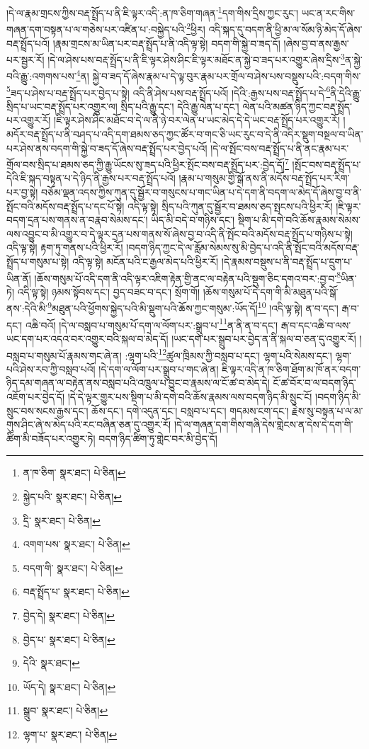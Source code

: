 །དེ་ལ་རྣམ་གྲངས་ཀྱིས་བརྡ་སྤྲོད་པ་ནི་ཇི་ལྟར་འདི་:ན་ཁ་ཅིག་གཞན་\footnote{ན་ཁ་ཅིག་  སྣར་ཐང་།  པེ་ཅིན། }དག་གིས་དྲིས་ཀྱང་རུང་། ཡང་ན་རང་གིས་གཞན་དག་བསྟན་པ་ལ་གཅེས་པར་འཛིན་པ་:བསྐྱེད་པའི་\footnote{སྐྱེད་པའི་  སྣར་ཐང་།  པེ་ཅིན། }ཕྱིར། འདི་སྐད་དུ་བདག་ནི་ཕྱི་མ་ལ་སོམ་ཉི་མེད་དོ་ཞེས་བརྡ་སྤྲོད་པའོ། །རྣམ་གྲངས་མ་ཡིན་པར་བརྡ་སྤྲོད་པ་ནི་འདི་ལྟ་སྟེ། བདག་གི་སྐྱེ་བ་ཟད་དོ། །ཞེས་བྱ་བ་ནས་རྒྱས་པར་སྦྱར་རོ། །དེ་ལ་ཤེས་པས་བརྡ་སྤྲོད་པ་ནི་ཇི་ལྟར་ཤེས་ཤིང་ཇི་ལྟར་མཐོང་ན་སྐྱེ་བ་ཟད་པར་འགྱུར་ཞེས་དྲིས་\footnote{དྲི་  སྣར་ཐང་།  པེ་ཅིན། }ན་སྐྱེ་བའི་རྒྱུ་:འགགས་པས་\footnote{འགག་པས་  སྣར་ཐང་།  པེ་ཅིན། }ན། སྐྱེ་བ་ཟད་དོ་ཞེས་རྣམ་པ་དེ་ལྟ་བུར་རྣམ་པར་གྲོལ་བ་ཤེས་པས་བསྡུས་པའི་:བདག་གིས་\footnote{བདག་གི་  སྣར་ཐང་།  པེ་ཅིན། }ཟད་པ་ཤེས་པ་བརྡ་སྤྲོད་པར་བྱེད་པ་སྟེ། འདི་ནི་ཤེས་པས་བརྡ་སྤྲོད་པའོ། །དེའི་:རྒྱས་པས་བརྡ་སྤྲོད་པ་དེ་\footnote{བརྡ་སྤྲོད་པ་  སྣར་ཐང་།  པེ་ཅིན། }ནི་དེའི་རྒྱུ་སྲིད་པ་ཡང་བརྡ་སྤྲོད་པར་འགྱུར་ལ། སྲིད་པའི་རྒྱུ་དང་། དེའི་རྒྱུ་ལེན་པ་དང་། ལེན་པའི་མཚན་ཉིད་ཀྱང་བརྡ་སྤྲོད་པར་འགྱུར་རོ། །ཇི་ལྟར་ཤེས་ཤིང་མཐོང་བ་དེ་ལ་ནི་ཉེ་བར་ལེན་པ་ཡང་མེད་དེ་དེ་ཡང་བརྡ་སྤྲོད་པར་འགྱུར་རོ། །མདོར་བརྡ་སྤྲོད་པ་ནི་བཤད་པ་འདི་དག་ཐམས་ཅད་ཀྱང་ཚོར་བ་གང་ཅི་ཡང་རུང་བ་དེ་ནི་འདིར་སྡུག་བསྔལ་བ་ཡིན་པར་ཤེས་ནས་བདག་གི་སྐྱེ་བ་ཟད་དོ་ཞེས་བརྡ་སྤྲོད་པར་བྱེད་པའོ། །དེ་ལ་སྤོང་བས་བརྡ་སྤྲོད་པ་ནི་ནང་རྣམ་པར་གྲོལ་བས་སྲིད་པ་ཐམས་ཅད་ཀྱི་རྒྱུ་ཡོངས་སུ་ཟད་པའི་ཕྱིར་སྤོང་བས་བརྡ་སྤྲོད་པར་:བྱེད་དོ།\footnote{བྱེད་དེ།  སྣར་ཐང་།  པེ་ཅིན། } །སྤོང་བས་བརྡ་སྤྲོད་པ་དེའི་ཇི་སྐད་བསྟན་པ་དེ་ཉིད་ནི་རྒྱས་པར་བརྡ་སྤྲོད་པའོ། །རྣམ་པ་གསུམ་གྱི་སྒོ་ནས་ནི་མདོས་བརྡ་སྤྲོད་པར་རིག་པར་བྱ་སྟེ། བཅོམ་ལྡན་འདས་ཀྱིས་ཀུན་དུ་སྦྱོར་བ་གསུངས་པ་གང་ཡིན་པ་དེ་དག་ནི་བདག་ལ་མེད་དོ་ཞེས་བྱ་བ་ནི་སྤོང་བའི་མདོས་བརྡ་སྤྲོད་པ་དང་པོ་སྟེ། འདི་ལྟ་སྟེ། སྲིད་པའི་ཀུན་དུ་སྦྱོར་བ་ཐམས་ཅད་སྤངས་པའི་ཕྱིར་རོ། །ཇི་ལྟར་བདག་དྲན་པས་གནས་ན་བརྣབ་སེམས་དང་། ཡིད་མི་བདེ་བ་གཉིས་དང་། སྡིག་པ་མི་དགེ་བའི་ཆོས་རྣམས་སེམས་ལས་འབྱུང་བ་མི་འགྱུར་བ་དེ་ལྟར་དྲན་པས་གནས་སོ་ཞེས་བྱ་བ་འདི་ནི་སྤོང་བའི་མདོས་བརྡ་སྤྲོད་པ་གཉིས་པ་སྟེ། འདི་ལྟ་སྟེ། རྟག་ཏུ་གནས་པའི་ཕྱིར་རོ། །བདག་ཉིད་ཀྱང་དེ་ལ་རློམ་སེམས་སུ་མི་བྱེད་པ་འདི་ནི་སྤོང་བའི་མདོས་བརྡ་སྤྲོད་པ་གསུམ་པ་སྟེ། འདི་ལྟ་སྟེ། མངོན་པའི་ང་རྒྱལ་མེད་པའི་ཕྱིར་རོ། །དེ་རྣམས་བསྡུས་པ་ནི་བརྡ་སྤྲོད་པ་དྲུག་པ་ཡིན་ནོ། །ཆོས་གསུམ་པོ་འདི་དག་ནི་འདི་ལྟར་འཇིག་རྟེན་གྱི་ནང་ལ་བརྟེན་པའི་སྡུག་ཅིང་དགའ་བར་:བྱ་བ་\footnote{བྱེད་པ་  སྣར་ཐང་།  པེ་ཅིན། }ཡིན་ཏེ། འདི་ལྟ་སྟེ། ཉམས་སྟོབས་དང་། བྱད་བཟང་བ་དང་། སྲོག་གོ། །ཆོས་གསུམ་པོ་དེ་དག་གི་མི་མཐུན་པའི་སྒོ་ནས་:དེའི་མི་\footnote{དེའི་  སྣར་ཐང་། }མཐུན་པའི་ཕྱོགས་སྐྱེད་པའི་མི་སྡུག་པའི་ཆོས་ཀྱང་གསུམ་:ཡོད་དོ།\footnote{ཡོད་དེ།  སྣར་ཐང་།  པེ་ཅིན། } །འདི་ལྟ་སྟེ། ན་བ་དང་། རྒ་བ་དང་། འཆི་བའོ། །དེ་ལ་བསླབ་པ་གསུམ་པོ་དག་ལ་ལོག་པར་:སྒྲུབ་པ་\footnote{སྒྲུབ་  སྣར་ཐང་།  པེ་ཅིན། }ན་ནི་ན་བ་དང་། རྒ་བ་དང་འཆི་བ་ལས་ཡང་དག་པར་འདའ་བར་འགྱུར་བའི་སྐལ་བ་མེད་དོ། །ཡང་དག་པར་སྒྲུབ་པར་བྱེད་ན་ནི་སྐལ་བ་ཅན་དུ་འགྱུར་རོ། །བསླབ་པ་གསུམ་པོ་རྣམས་གང་ཞེ་ན། :ལྷག་པའི་\footnote{ལྷག་པ་  སྣར་ཐང་།  པེ་ཅིན། }ཚུལ་ཁྲིམས་ཀྱི་བསླབ་པ་དང་། ལྷག་པའི་སེམས་དང་། ལྷག་པའི་ཤེས་རབ་ཀྱི་བསླབ་པའོ། །དེ་དག་ལ་ལོག་པར་སྒྲུབ་པ་གང་ཞེ་ན། ཇི་ལྟར་འདི་ན་ཁ་ཅིག་ཐོག་མ་ཁོ་ནར་བདག་ཉིད་དམ་གཞན་ལ་བརྟེན་ནས་བསླབ་པའི་འཁྲུལ་པ་བྱུང་བ་རྣམས་ལ་ངོ་ཚ་བ་མེད་དེ། ངོ་ཚ་བོར་བ་ལ་བདག་ཉིད་འཇོག་པར་བྱེད་དོ། །དེ་དེ་ལྟར་གྱུར་པས་སྡིག་པ་མི་དགེ་བའི་ཆོས་རྣམས་ལས་བདག་ཉིད་མི་སྲུང་ངོ། །བདག་ཉིད་མི་སྲུང་བས་སངས་རྒྱས་དང་། ཆོས་དང་། དགེ་འདུན་དང་། བསླབ་པ་དང་། གདམས་ངག་དང་། རྗེས་སུ་བསྟན་པ་ལ་མ་གུས་ཤིང་ཞེ་ས་མེད་པའི་རང་བཞིན་ཅན་དུ་འགྱུར་རོ། །དེ་ལ་གཞན་དག་གིས་གཞི་དེས་གླེངས་ན་དེས་དེ་དག་གི་ཚིག་མི་བཟོད་པར་འགྱུར་ཏེ། བདག་ཉིད་ཚིག་ཏུ་གླེང་བར་མི་བྱེད་དོ། 